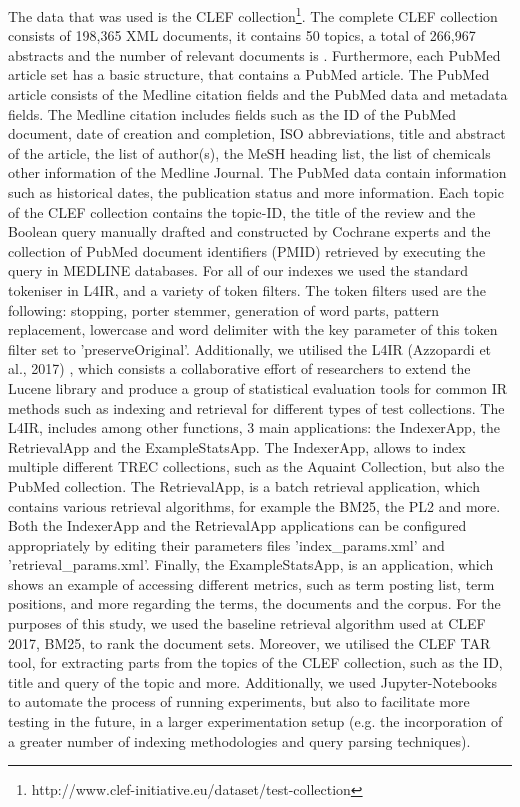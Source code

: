 The data that was used is the CLEF collection\footnote{http://www.clef-initiative.eu/dataset/test-collection}. The complete CLEF collection consists of 198,365 XML documents, it contains 50 topics, a total of 266,967 abstracts and the number of relevant documents is  . Furthermore, each PubMed article set has a basic structure, that contains a PubMed article. The PubMed article consists of the Medline citation fields and the PubMed data and metadata fields. The Medline citation includes fields such as the ID of the PubMed document, date of creation and completion, ISO abbreviations, title and abstract of the article, the list of author(s), the MeSH heading list, the list of chemicals other information of the Medline Journal. The PubMed data contain information such as historical dates, the publication status and more information. Each topic of the CLEF collection contains the topic-ID, the title of the review and the Boolean query manually drafted and constructed by Cochrane experts and the collection of PubMed document identifiers (PMID) retrieved by executing the query in MEDLINE databases. For all of our indexes we used the standard tokeniser in L4IR, and a variety of token filters. The token filters used are the following: stopping, porter stemmer, generation of word parts, pattern replacement, lowercase and word delimiter with the key parameter of this token filter set to 'preserveOriginal'. Additionally, we utilised the L4IR (Azzopardi et al., 2017) \cite{azzopardi2017lucene4ir}, which consists a collaborative effort of researchers to extend the Lucene library and produce a group of statistical evaluation tools for common IR methods such as indexing and retrieval for different types of test collections. The L4IR, includes among other functions, 3 main applications: the IndexerApp, the RetrievalApp and the ExampleStatsApp. The IndexerApp, allows to index multiple different TREC collections, such as the Aquaint Collection, but also the PubMed collection. The RetrievalApp, is a batch retrieval application, which contains various retrieval algorithms, for example the BM25, the PL2 and more. Both the IndexerApp and the RetrievalApp applications can be configured appropriately by editing their parameters files 'index\_params.xml' and 'retrieval\_params.xml'. Finally, the ExampleStatsApp, is an application, which shows an example of accessing different metrics, such as term posting list, term positions, and more regarding the terms, the documents and the corpus. For the purposes of this study, we used the baseline retrieval algorithm used at CLEF 2017, BM25, to rank the document sets. Moreover, we utilised the CLEF TAR tool, for extracting parts from the topics of the CLEF collection, such as the ID, title and query of the topic and more. Additionally, we used Jupyter-Notebooks to automate the process of running experiments, but also to facilitate more testing in the future, in a larger experimentation setup (e.g. the incorporation of a greater number of indexing methodologies and query parsing techniques).

